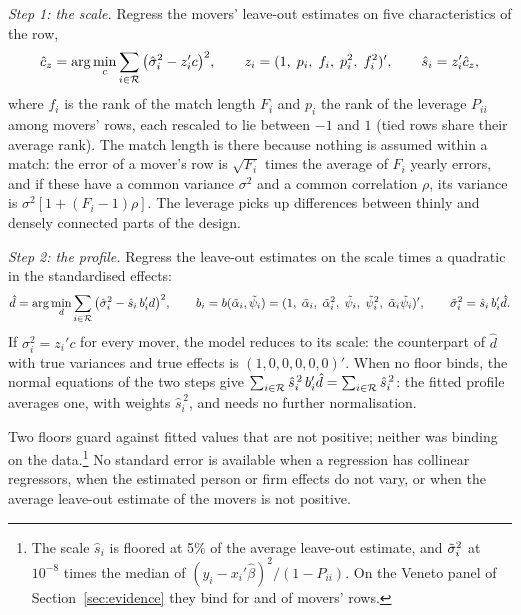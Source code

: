 \emph{Step 1: the scale.} Regress the movers' leave-out estimates on five characteristics of the row,
\begin{equation}\label{eq:scale}
\hat c_z=\arg\min_c\sum_{i\in\mathcal{R}}\big(\hat\sigma_i^2-z_i'c\big)^2,\qquad z_i=(1,\;p_i,\;f_i,\;p_i^2,\;f_i^2)',\qquad \hat s_i=z_i'\hat c_z ,
\end{equation}
where $f_i$ is the rank of the match length $F_i$ and $p_i$ the rank of the leverage $P_{ii}$ among movers'
rows, each rescaled to lie between $-1$ and $1$ (tied rows share their average rank). The match length is there
because nothing is assumed within a match: the error of a mover's row is $\sqrt{F_i}$ times the average of $F_i$
yearly errors, and if these have a common variance $\sigma^2$ and a common correlation $\rho$, its variance is
$\sigma^2[1+(F_i-1)\rho]$. The leverage picks up differences between thinly and densely connected parts of the
design.

\emph{Step 2: the profile.} Regress the leave-out estimates on the scale times a quadratic in the standardised
effects:
\begin{equation}\label{eq:profile}
\hat d=\arg\min_d\sum_{i\in\mathcal{R}}\big(\hat\sigma_i^2-\hat s_i\,b_i'd\big)^2,\qquad
b_i=b(\tilde\alpha_i,\tilde\psi_i)=(1,\;\tilde\alpha_i,\;\tilde\alpha_i^2,\;\tilde\psi_i,\;\tilde\psi_i^2,\;\tilde\alpha_i\tilde\psi_i)',\qquad
\tilde\sigma_i^2=\hat s_i\,b_i'\hat d .
\end{equation}
If $\sigma_i^2=z_i'c$ for every mover, the model reduces to its scale: the counterpart of $\hat d$ with
true variances and true effects is $(1,0,0,0,0,0)'$. When no floor binds, the normal equations of the two steps
give $\sum_{i\in\mathcal{R}}\hat s_i^{\,2}\,b_i'\hat d=\sum_{i\in\mathcal{R}}\hat s_i^{\,2}$: the fitted profile averages one,
with weights $\hat s_i^{\,2}$, and needs no further normalisation.

Two floors guard against fitted values that are not positive; neither was binding on the data.\footnote{The
scale $\hat s_i$ is floored at 5\% of the average leave-out estimate, and $\tilde\sigma_i^2$ at $10^{-8}$ times the median
of $(y_i-x_i'\hat\beta)^2/(1-P_{ii})$. On the Veneto panel of Section~\ref{sec:evidence} they bind for
 and  of movers' rows.} No standard error is available when a regression
has collinear regressors, when the estimated person or firm effects do not vary, or when the average leave-out
estimate of the movers is not positive.

